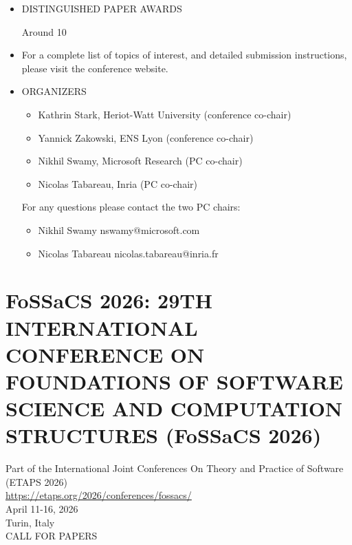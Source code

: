 \documentclass[prodmode,acmtecs]{acmsmall} %
\begin{document}
\begin{itemize}
\item  DISTINGUISHED PAPER AWARDS 
 
  Around 10%
 
\item  For a complete list of topics of interest, and detailed submission instructions, please visit the conference website.  
 
\item  ORGANIZERS 
 
\begin{itemize}\item  Kathrin Stark, Heriot-Watt University (conference co-chair)
\item  Yannick Zakowski, ENS Lyon (conference co-chair)
\item  Nikhil Swamy, Microsoft Research (PC co-chair)
\item  Nicolas Tabareau, Inria (PC co-chair)
\end{itemize} 
  For any questions please contact the two PC chairs: 
 
\begin{itemize}\item  Nikhil Swamy nswamy@microsoft.com
\item  Nicolas Tabareau nicolas.tabareau@inria.fr
\end{itemize} 
\end{itemize}\section{FoSSaCS 2026: 29TH INTERNATIONAL CONFERENCE ON FOUNDATIONS OF SOFTWARE SCIENCE AND COMPUTATION STRUCTURES (FoSSaCS 2026)}\label{FoSSaCS2026}  Part of the International Joint Conferences On Theory and Practice of  Software (ETAPS 2026)\\ 
  \href{https://etaps.org/2026/conferences/fossacs/}{https://etaps.org/2026/conferences/fossacs/}\\ 
  April 11-16, 2026\\ 
  Turin, Italy\\ 
CALL FOR PAPERS 
\end{document}
